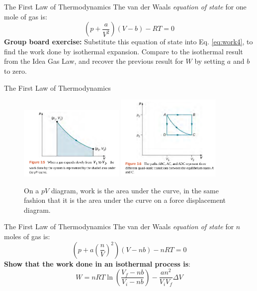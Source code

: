 \documentclass{beamer}
\begin{document}
\begin{frame}{The First Law of Thermodynamics}
The van der Waals \textit{equation of state} for one mole of gas is: 
\begin{equation}
\left(p+\frac{a}{V^2}\right)\left(V-b\right) - RT = 0
\label{eq:vanDerWaals}
\end{equation}
\textbf{Group board exercise:} Substitute this equation of state into Eq. \ref{eq:work4}, to find the work done by isothermal expansion.  Compare to the isothermal result from the Idea Gas Law, and recover the previous result for $W$ by setting $a$ and $b$ to zero.
\end{frame}

\begin{frame}{The First Law of Thermodynamics}
\begin{figure}
\centering
\includegraphics[width=0.45\textwidth]{figures/area1.png}
\includegraphics[width=0.45\textwidth]{figures/area2.png}
\caption{\label{fig:area} \small On a $pV$ diagram, work is the area under the curve, in the same fashion that it is the area under the curve on a force displacement diagram.}
\end{figure}
\end{frame}

\begin{frame}{The First Law of Thermodynamics}
The van der Waals \textit{equation of state} for $n$ moles of gas is: 
\begin{equation}
\left(p+a\left(\frac{n}{V}\right)^2\right)\left(V-nb\right) - nRT = 0
\label{eq:vanDerWaals2}
\end{equation}
\textbf{Show that the work done in an isothermal process is}: 
\begin{equation}
\boxed{
W = nRT\ln\left(\frac{V_f-nb}{V_i-nb}\right)-\frac{an^2}{V_iV_f}\Delta V}
\end{equation}
\end{frame}
\end{document}
